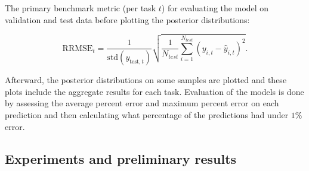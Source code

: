 \documentclass[11pt]{article}
\begin{document}
The primary benchmark metric (per task $t$) for evaluating the model on validation and test data before plotting the posterior distributions:
  

\begin{equation}
  \mathrm{RRMSE}_t
  = \frac{1}{\mathrm{std}(y_{\mathrm{test},t})} \sqrt{\frac{1}{N_{test}} \sum_{i=1}^{N_{test}} (y_{i,t} - \hat{y}_{i,t})^2}.
  \label{eq:rrmse}
\end{equation}

Afterward, the posterior distributions on some samples are plotted and these plots include the aggregate results for each task. Evaluation of the models is done by assessing the average percent error and maximum percent error on each prediction and then calculating what percentage of the predictions had under $1\%$ error.


\subsection{Experiments and preliminary results}
\label{sec:progress-experiments}
\end{document}
